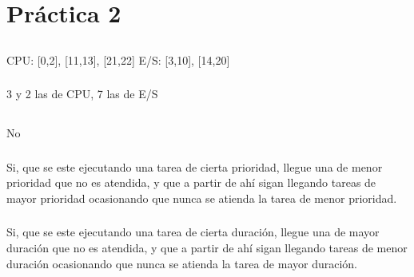 \section{Práctica 2}

\subsection{}

\subsubsection{}

CPU: [0,2], [11,13], [21,22]
E/S: [3,10], [14,20]

\subsubsection{}

3 y 2 las de CPU, 7 las de E/S

\setcounter{subsection}{3}
\subsection{}

\subsubsection{}

No

\subsubsection{}

Si, que se este ejecutando una tarea de cierta prioridad, llegue una de menor
prioridad que no es atendida, y que a partir de ahí sigan llegando tareas de
mayor prioridad ocasionando que nunca se atienda la tarea de menor prioridad.

\subsubsection{}

Si, que se este ejecutando una tarea de cierta duración, llegue una de mayor
duración que no es atendida, y que a partir de ahí sigan llegando tareas de
menor duración ocasionando que nunca se atienda la tarea de mayor duración.

\subsubsection{}

